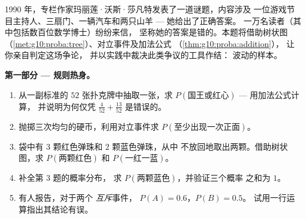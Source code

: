 \begin{problem}
\label{pb:g10:proba:1}
1990 年，专栏作家玛丽莲·沃斯·莎凡特发表了一道谜题，内容涉及
一位游戏节目主持人、三扇门、一辆汽车和两只山羊 --- 她给出了正确答案。
一万名读者（其中包括数百位数学博士）纷纷来信，
坚称她的答案是错的。本题将借助树状图
（\cref{met:g10:proba:tree}）、对立事件及加法公式
（\cref{thm:g10:proba:addition}），
让你亲自判定这场争论，
并以实践中裁决此类争议的工具作结：
波动的样本。

\medskip
\noindent\textbf{第一部分 --- 规则热身。}
\begin{enumerate}
  \item 从一副标准的 $52$ 张扑克牌中抽取一张，求
        $P(\text{国王或红心})$ --- 用加法公式计算，
        并说明为何仅凭 $\frac{4}{52} + \frac{13}{52}$
        是错误的。
  \item 抛掷三次均匀的硬币，利用对立事件求
        $P(\text{至少出现一次正面})$。
  \item 袋中有 $3$ 颗红色弹珠和 $2$ 颗蓝色弹珠，从中
        不放回地取出两颗。借助树状图，求
        $P(\text{两颗红色})$ 和 $P(\text{一红一蓝})$。
  \item 补全第 3 题的概率分布，
        求 $P(\text{两颗蓝色})$，并验证三个概率
        之和为 $1$。
  \item 有人报告，对于两个 \emph{互斥}事件，
        $P(A) = 0.6$，$P(B) = 0.5$。
        试用一行运算指出其结论有误。
\end{enumerate}


\end{problem}
